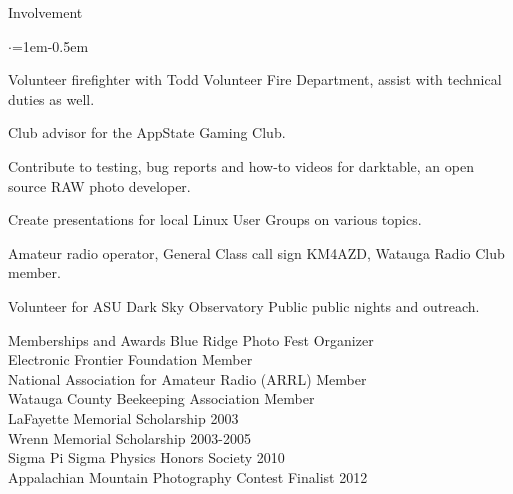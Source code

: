 \documentclass{new_cv} %
\begin{document}
\begin{rSection}
	{Involvement}
	\begin{list}{$\cdot$}{\leftmargin=1em}\itemsep -0.5em \vspace{-0.5em} 
		\item {Volunteer firefighter with Todd Volunteer Fire Department, assist with technical duties as well.}
		\item {Club advisor for the AppState Gaming Club.}
		\item {Contribute to testing, bug reports and how-to videos for darktable, an open source RAW photo developer.}
		\item {Create presentations for local Linux User Groups on various topics.}
		\item {Amateur radio operator, General Class call sign KM4AZD, Watauga Radio Club member.}
		\item {Volunteer for ASU Dark Sky Observatory Public public nights and outreach.}
	\end{list}
	\vspace{0.5em}
\end{rSection}

\begin{rSection}{Memberships and Awards}
Blue Ridge Photo Fest \hfill Organizer\\
Electronic Frontier Foundation  \hfill  Member\\
National Association for Amateur Radio (ARRL)  \hfill  Member\\
Watauga County Beekeeping Association  \hfill  Member \\
LaFayette Memorial Scholarship \hfill  2003 \\
Wrenn Memorial Scholarship  \hfill  2003-2005 \\
Sigma Pi Sigma Physics Honors Society  \hfill  2010 \\
Appalachian Mountain Photography Contest Finalist  \hfill  2012 \\
\end{rSection}
\end{document}
